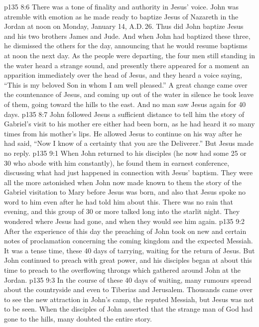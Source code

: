 \vs p135 8:6 \pc There was a tone of finality and authority in Jesus’ voice. John was atremble with emotion as he made ready to baptize Jesus of Nazareth in the Jordan at noon on Monday, January 14, A.D.\,26. Thus did John baptize Jesus and his two brothers James and Jude. And when John had baptized these three, he dismissed the others for the day, announcing that he would resume baptisms at noon the next day. As the people were departing, the four men still standing in the water heard a strange sound, and presently there appeared for a moment an apparition immediately over the head of Jesus, and they heard a voice saying, “This is my beloved Son in whom I am well pleased.” A great change came over the countenance of Jesus, and coming up out of the water in silence he took leave of them, going toward the hills to the east. And no man saw Jesus again for 40 days.
\vs p135 8:7 John followed Jesus a sufficient distance to tell him the story of Gabriel’s visit to his mother ere either had been born, as he had heard it so many times from his mother’s lips. He allowed Jesus to continue on his way after he had said, “Now I know of a certainty that you are the Deliverer.” But Jesus made no reply.
\vs p135 9:1 When John returned to his disciples (he now had some 25 or 30 who abode with him constantly), he found them in earnest conference, discussing what had just happened in connection with Jesus’ baptism. They were all the more astonished when John now made known to them the story of the Gabriel visitation to Mary before Jesus was born, and also that Jesus spoke no word to him even after he had told him about this. There was no rain that evening, and this group of 30 or more talked long into the starlit night. They wondered where Jesus had gone, and when they would see him again.
\vs p135 9:2 \pc After the experience of this day the preaching of John took on new and certain notes of proclamation concerning the coming kingdom and the expected Messiah. It was a tense time, these 40 days of tarrying, waiting for the return of Jesus. But John continued to preach with great power, and his disciples began at about this time to preach to the overflowing throngs which gathered around John at the Jordan.
\vs p135 9:3 In the course of these 40 days of waiting, many rumours spread about the countryside and even to Tiberias and Jerusalem. Thousands came over to see the new attraction in John’s camp, the reputed Messiah, but Jesus was not to be seen. When the disciples of John asserted that the strange man of God had gone to the hills, many doubted the entire story.
